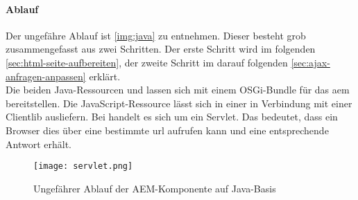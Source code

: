 \paragraph{Ablauf}
Der ungefähre Ablauf ist \autoref{img:java} zu entnehmen. Dieser besteht grob zusammengefasst aus zwei Schritten. Der erste Schritt wird im folgenden \autoref{sec:html-seite-aufbereiten}, der zweite Schritt im darauf folgenden \autoref{sec:ajax-anfragen-anpassen} erklärt. \\
Die beiden Java-Ressourcen  und  lassen sich mit einem OSGi-Bundle für das \ac{aem} bereitstellen. Die JavaScript-Ressource  lässt sich in einer \ajc in Verbindung mit einer Clientlib ausliefern. 
Bei  handelt es sich um ein Servlet. Das bedeutet, dass ein Browser dies über eine bestimmte \ac{url} aufrufen kann und eine entsprechende Antwort erhält.

\begin{figure}[H]
	\begin{center}
		\texttt{[image: servlet.png]}
		\caption{Ungefährer Ablauf der AEM-Komponente auf Java-Basis}
		\label{img:java}
	\end{center}
\end{figure}


